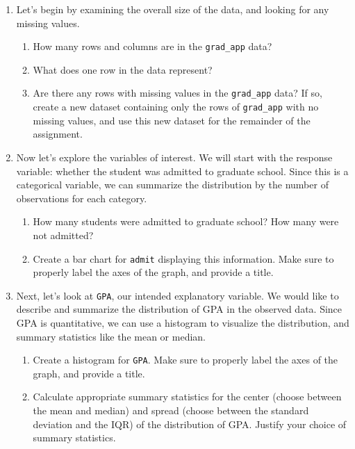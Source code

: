 \documentclass[11pt]{article}
\begin{document}
\begin{enumerate}
\item Let's begin by examining the overall size of the data, and looking for any missing values.

\begin{enumerate}
\item How many rows and columns are in the \verb;grad_app; data?

\item What does one row in the data represent?

\item Are there any rows with missing values in the \verb;grad_app; data? If so, create a new dataset containing only the rows of \verb;grad_app; with no missing values, and use this new dataset for the remainder of the assignment.
\end{enumerate}

\item Now let's explore the variables of interest. We will start with the response variable: whether the student was admitted to graduate school. Since this is a categorical variable, we can summarize the distribution by the number of observations for each category.

\begin{enumerate}
\item How many students were admitted to graduate school? How many were not admitted?

\item Create a bar chart for \verb;admit; displaying this information. Make sure to properly label the axes of the graph, and provide a title.
\end{enumerate}

\item Next, let's look at \verb;GPA;, our intended explanatory variable. We would like to describe and summarize the distribution of GPA in the observed data. Since GPA is quantitative, we can use a histogram to visualize the distribution, and summary statistics like the mean or median.

\begin{enumerate}
\item Create a histogram for \verb;GPA;. Make sure to properly label the axes of the graph, and provide a title.

\item Calculate appropriate summary statistics for the center (choose between the mean and median) and spread (choose between the standard deviation and the IQR) of the distribution of GPA. Justify your choice of summary statistics.


\end{enumerate}
\end{enumerate}
\end{document}
